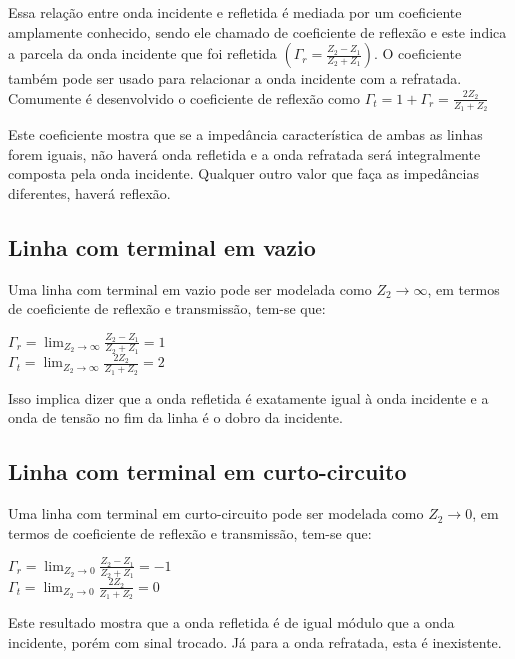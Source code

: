 Essa relação entre onda incidente e refletida é mediada por um coeficiente amplamente conhecido, sendo ele chamado de coeficiente de reflexão e este indica a parcela da onda incidente que foi refletida $\left(\Gamma_r = \frac{Z_2-Z_1}{Z_2+Z_1} \right)$. O coeficiente também pode ser usado para relacionar a onda incidente com a refratada. Comumente é desenvolvido o coeficiente de reflexão como $\Gamma_t=1+\Gamma_r  = \frac{2Z_2}{Z_1+Z_2}$

Este coeficiente mostra que se a impedância característica de ambas as linhas forem iguais, não haverá onda refletida e a onda refratada será integralmente composta pela onda incidente. Qualquer outro valor que faça as impedâncias diferentes, haverá reflexão.

\subsection{Linha com terminal em vazio}

Uma linha com terminal em vazio pode ser modelada como $Z_2\longrightarrow	\infty$, em termos de coeficiente de reflexão e transmissão, tem-se que:

\begin{center}
    $\Gamma_r = \lim_{Z_2\to\infty} \frac{Z_2-Z_1}{Z_2+Z_1} = 1$ \\ \vspace{1pt}
    $\Gamma_t = \lim_{Z_2\to\infty}  \frac{2Z_2}{Z_1+Z_2} = 2$
\end{center}

Isso implica dizer que a onda refletida é exatamente igual à onda incidente e a onda de tensão no fim da linha é o dobro da incidente.

\subsection{Linha com terminal em curto-circuito}

Uma linha com terminal em curto-circuito pode ser modelada como $Z_2\longrightarrow	0$, em termos de coeficiente de reflexão e transmissão, tem-se que:

\begin{center}
    $\Gamma_r = \lim_{Z_2\to 0} \frac{Z_2-Z_1}{Z_2+Z_1} = -1$ \\ \vspace{1pt}
    $\Gamma_t = \lim_{Z_2\to 0}  \frac{2Z_2}{Z_1+Z_2} = 0$
\end{center}

Este resultado mostra que a onda refletida é de igual módulo que a onda incidente, porém com sinal trocado. Já para a onda refratada, esta é inexistente.

